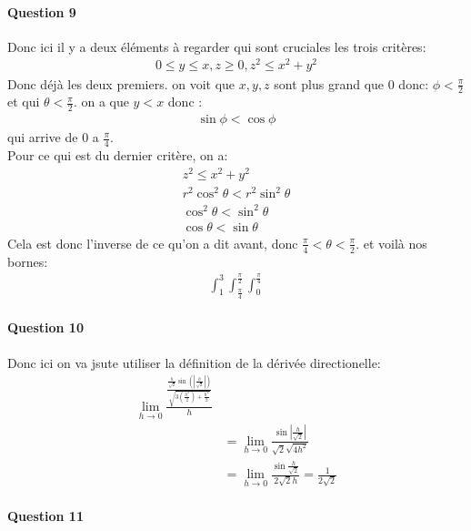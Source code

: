 \documentclass[a4paper]{article}
\begin{document}
\paragraph{Question 9}
Donc ici il y a deux éléments à regarder qui sont cruciales les trois critères:
\begin{align*} 
	0 \leq y \leq x, z \geq 0, z^2 \leq x^2 + y^2
\end{align*}
Donc déjà les deux premiers. on voit que $x, y, z$ sont plus grand que 0 donc: $\phi < \frac{\pi}{2}$  et qui $\theta < \frac{\pi}{2}$. on a que $y < x$ donc :
\begin{align*} \sin \phi < \cos \phi \end{align*}
qui arrive de $0$ a $\frac{\pi}{4}$.\\
Pour ce qui est  du dernier critère, on a:
\begin{align*} 
	z^2 \leq x^2 + y^2\\
	r^2 \cos^2\theta < r^2\sin^2\theta\\
	\cos^2\theta < \sin^2 \theta\\
\cos \theta < \sin \theta
\end{align*}
Cela est donc l'inverse de ce qu'on a dit avant, donc $\frac{\pi}{4} < \theta < \frac{\pi}{2}$. et voilà nos bornes:
\begin{align*} 
	\int_1^3 \int_{\frac{\pi}{4}}^{\frac{\pi}{2}} \int_0^{\frac{\pi}{4}}
\end{align*}
\paragraph{Question 10}
Donc ici on va jsute utiliser la définition de la dérivée directionelle:
\begin{align*} 
	\lim_{h \to 0}  \frac{\frac{\frac{h}{\sqrt{2}}\sin\left(\left|\frac{h}{\sqrt{2}}\right|\right)}{\sqrt{3\left(\frac{h^2}{2}\right) + \frac{h^2}{2}}}}{h}\\
	&= \lim_{h \to 0} \frac{\sin \left|\frac{h}{\sqrt{2}}\right|}{\sqrt{2}\sqrt{4h^2}}\\
	&= \lim_{h \to 0} \frac{\sin \frac{h}{\sqrt{2}}}{2\sqrt{2}h} = \frac{1}{2\sqrt{2}}
\end{align*}
\paragraph{Question 11}
\end{document}
